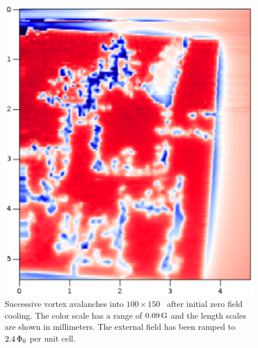 \begin{figure}[p]
\includegraphics[width=5.7in]{figs/prospective/fig1_c_lg.ps}
\caption[Successive vortex avalanches in to \jja, 
the external field has been ramped to $2.4\,\Phinot$ per unit cell.]
{Successive vortex avalanches into $100\times 150$ \jja\ after initial
zero field cooling. The color scale has a range of
$0.09\,\mathrm{G}$ and the length scales are shown in 
millimeters.
The external field has been ramped to $2.4\,\Phinot$ per unit cell.
}
\label{fig:initial_vortex_avalanche_c}
\end{figure}

%
%

